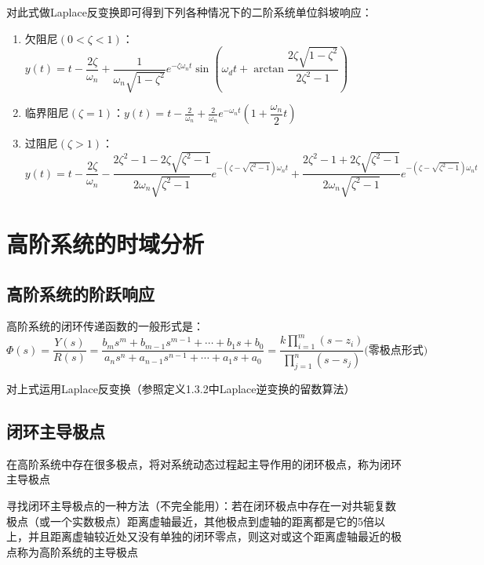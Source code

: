 对此式做Laplace反变换即可得到下列各种情况下的二阶系统单位斜坡响应：
\begin{enumerate}
    \item 欠阻尼$(0<\zeta<1)$：$y(t) = t-\dfrac{2\zeta}{\omega_n} + \dfrac{1}{\omega_n\sqrt{1-\zeta^2}} e^{-\zeta\omega_n t}\sin (\omega_d t + \arctan\dfrac{2\zeta\sqrt{1-\zeta^2}}{2\zeta^2 - 1})$

    \item 临界阻尼$(\zeta =1)$：$y(t) = t - \frac{2}{\omega_n} + \frac{2}{\omega_n}e^{-\omega_n t}(1 + \dfrac{\omega_n}{2} t)$

    \item 过阻尼$(\zeta >1)$：$y(t) = t - \dfrac{2\zeta}{\omega_n} - \dfrac{2\zeta^2 - 1 - 2\zeta\sqrt{\zeta^2 - 1}}{2\omega_n \sqrt{\zeta^2 - 1}}e^{-(\zeta - \sqrt{\zeta^2 - 1})\omega_n t} + \dfrac{2\zeta^2 - 1 +2\zeta \sqrt{\zeta^2 - 1}}{2\omega_n \sqrt{\zeta^2 -1}}e^{-(\zeta - \sqrt{\zeta^2-1})\omega_n t}$
\end{enumerate}

\section{高阶系统的时域分析}
\subsection{高阶系统的阶跃响应}
高阶系统的闭环传递函数的一般形式是：
\begin{equation*}
    \varPhi (s) = \frac{Y(s)}{R(s)} = \frac{b_m s^m + b_{m-1} s^{m-1} + \cdots + b_1 s +b_0}{a_n s^n + a_{n-1} s^{n-1} + \cdots + a_1 s +a_0} = \frac{k\prod_{i=1}^m(s-z_i)}{\prod_{j=1}^n(s-s_j)}\text{(零极点形式)}
\end{equation*}

对上式运用Laplace反变换（参照定义1.3.2中Laplace逆变换的留数算法）

\subsection{闭环主导极点}
\begin{definition}[闭环主导极点]
    在高阶系统中存在很多极点，将对系统动态过程起主导作用的闭环极点，称为闭环主导极点
\end{definition}

寻找闭环主导极点的一种方法（不完全能用）：若在闭环极点中存在一对共轭复数极点（或一个实数极点）距离虚轴最近，其他极点到虚轴的距离都是它的5倍以上，并且距离虚轴较近处又没有单独的闭环零点，则这对或这个距离虚轴最近的极点称为高阶系统的主导极点

